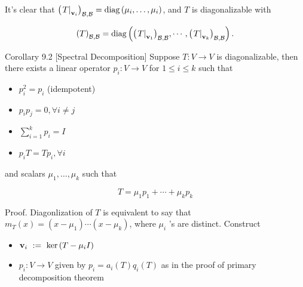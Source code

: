 \documentclass[11pt]{article}
\begin{document}
It’s clear that \({\left( {\left. T\right| }_{{\bf v}_{i}}\right) }_{\mathcal{B},\mathcal{B}} = \operatorname{diag}\left( {{\mu }_{i},\ldots ,{\mu }_{i}}\right)\), and \(T\) is diagonalizable with

\[
{\left( T\right) }_{\mathcal{B},\mathcal{B}} = \operatorname{diag}\left( {{\left( {\left. T\right| }_{{\bf v}_1}\right) }_{\mathcal{B},\mathcal{B}},\cdots ,{\left( {\left. T\right| }_{{\bf v}_{k}}\right) }_{\mathcal{B},\mathcal{B}}}\right) .
\]

Corollary 9.2 [Spectral Decomposition] Suppose \(T : V \rightarrow  V\) is diagonalizable, then there exists a linear operator \({p}_{i} : V \rightarrow  V\) for \(1 \leq  i \leq  k\) such that

\begin{itemize}
\item \({p}_{i}^2 = {p}_{i}\) (idempotent)
\end{itemize}

\begin{itemize}
\item \({p}_{i}{p}_{j} = 0,\forall i \neq  j\)
\end{itemize}

\begin{itemize}
\item \(\mathop{\sum }\limits_{{i = 1}}^{k}{p}_{i} = I\)
\end{itemize}

\begin{itemize}
\item \({p}_{i}T = T{p}_{i},\forall i\)
\end{itemize}

and scalars \({\mu }_1,\ldots ,{\mu }_{k}\) such that

\[
T = {\mu }_1{p}_1 + \cdots  + {\mu }_{k}{p}_{k}
\]

Proof. Diagonlization of \(T\) is equivalent to say that \({m}_{T}\left( x\right)  = \left( {x - {\mu }_1}\right) \cdots \left( {x - {\mu }_{k}}\right)\), where \({\mu }_{i}\) ’s are distinct. Construct

\begin{itemize}
\item \({\bf v}_{i} \mathrel{\text{ := }} \ker \left( {T - {\mu }_{i}I}\right)\)
\end{itemize}

\begin{itemize}
\item \({p}_{i} : V \rightarrow  V\) given by \({p}_{i} = {a}_{i}\left( T\right) {q}_{i}\left( T\right)\) as in the proof of primary decomposition theorem
\end{itemize}
\end{document}
